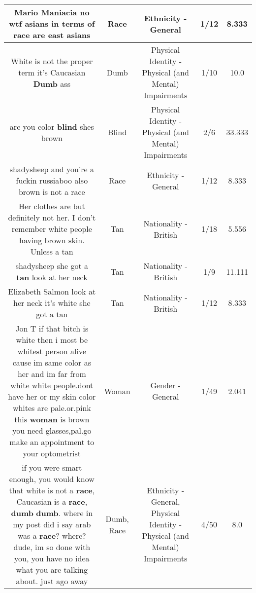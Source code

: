 \documentclass[11pt]{article}
\newlength\mylength
\begin{document}
\begin{center}
\begin{longtable}{|C{.65\mylength}|C{.30\mylength}|C{.12\mylength}|C{.12\mylength}|C{.12\mylength}|}
  \small Mario Maniacia no wtf asians in terms of \textbf{race} are east asians\normalsize   & Race & Ethnicity - General & 1/12 & 8.333 \\  \hline
  \small White is not the proper term it's Caucasian \textbf{Dumb} ass\normalsize   & Dumb & Physical Identity - Physical (and Mental) Impairments & 1/10 & 10.0 \\  \hline
  \small are you color \textbf{blind} shes brown\normalsize   & Blind & Physical Identity - Physical (and Mental) Impairments & 2/6 & 33.333 \\  \hline
  \small shadysheep and you're a fuckin russiaboo also brown is not a race\normalsize   & Race & Ethnicity - General & 1/12 & 8.333 \\  \hline
  \small Her clothes are but definitely not her. I don't remember white people having brown skin. Unless a tan\normalsize   & Tan & Nationality - British & 1/18 & 5.556 \\  \hline
  \small shadysheep she got a \textbf{tan} look at her neck\normalsize   & Tan & Nationality - British & 1/9 & 11.111 \\  \hline
  \small Elizabeth Salmon look at her neck it's white she got a tan\normalsize   & Tan & Nationality - British & 1/12 & 8.333 \\  \hline
  \small Jon T if that bitch is white then i most be whitest person alive cause im same color as her and im far from white white people.dont have her or my skin color whites are pale.or.pink this \textbf{woman} is brown you need glasses,pal.go make an appointment to your optometrist\normalsize   & Woman & Gender - General & 1/49 & 2.041 \\  \hline
  \small if you were smart enough, you would know that white is not a \textbf{race}, Caucasian is a \textbf{race}, \textbf{dumb} \textbf{dumb}. where in my post did i say arab was a \textbf{race}? where? dude, im so done with you, you have no idea what you are talking about. just ago away\normalsize   & Dumb, Race & Ethnicity - General, Physical Identity - Physical (and Mental) Impairments & 4/50 & 8.0 \\  \hline

\end{longtable}
\end{center}
\end{document}
